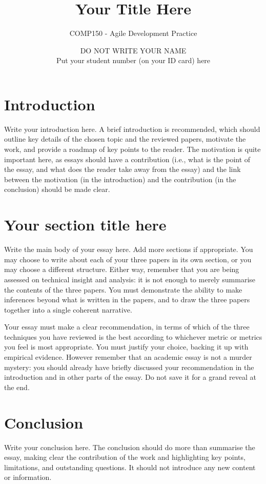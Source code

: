\documentclass{scrartcl}
\title{Your Title Here}
\subtitle{COMP150 - Agile Development Practice}
\author{DO NOT WRITE YOUR NAME\\Put your student number (on your ID card) here}
\begin{document}
\maketitle


\section{Introduction}

Write your introduction here. A brief introduction is recommended, which should outline key details of the chosen topic and the reviewed papers, motivate the work, and provide a roadmap of key points to the reader. The motivation is quite important here, as essays should have a contribution (i.e., what is the point of the essay, and what does the reader take away from the essay) and the link between the motivation (in the introduction) and the contribution (in the conclusion) should be made clear.

\section{Your section title here}

Write the main body of your essay here. Add more sections if appropriate. You may choose to write about each of your three papers in its own section, or you may choose a different structure. Either way, remember that you are being assessed on technical insight and analysis: it is not enough to merely summarise the contents of the three papers. You must demonstrate the ability to make inferences beyond what is written in the papers, and to draw the three papers together into a single coherent narrative.

Your essay must make a clear recommendation, in terms of which of the three techniques you have reviewed is the best according to whichever metric or metrics you feel is most appropriate. You must justify your choice, backing it up with empirical evidence. However remember that an academic essay is not a murder mystery: you should already have briefly discussed your recommendation in the introduction and in other parts of the essay. Do not save it for a grand reveal at the end.

\section{Conclusion}

Write your conclusion here. The conclusion should do more than summarise the essay, making clear the contribution of the work and highlighting key points, limitations, and outstanding questions. It should not introduce any new content or information.



\end{document}
